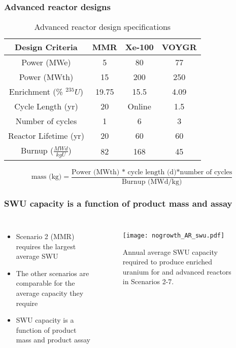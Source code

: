 \begin{frame}
    \frametitle{Advanced reactor designs}
    \begingroup
        \renewcommand{\arraystretch}{1.5}
        \begin{table}
            \small
            \caption{Advanced reactor design specifications}
            \label{tab:reactor_summary}
            \begin{tabular}{ c c c c }
                \hline
                Design Criteria & MMR 
                    \cite{noauthor_usnc_2021} & 
                    Xe-100 \cite{mulder_overview_2021} & 
                    VOYGR \cite{nuscale_chapter_2020-1,reyes_nuscale_2021,reyes_correction_2022}\\\hline
                Power (MWe) & 5 & 80 & 77\\
                Power (MWth) & 15 & 200 & 250\\
                Enrichment (\% $^{235}U$) & 19.75 & 15.5 & 4.09 \\
                Cycle Length (yr) & 20 & Online & 1.5 \\
                Number of cycles & 1 & 6 & 3\\
                Reactor Lifetime (yr) & 20 & 60 & 60\\
                Burnup ($\frac{MWd}{kg U}$) & 82 & 168 & 45\\
                \hline
            \end{tabular}
        \end{table}   
    \endgroup
    \begin{equation*}
        \text{mass (kg)} = \frac{\text{Power (MWth) * cycle length (d)*number of cycles}}{\text{Burnup (MWd/kg)}}
        \label{eq:fuel_mass}
    \end{equation*}
\end{frame}

\begin{frame}
    \frametitle{\gls{SWU} capacity is a function of product mass and assay}
    \begin{columns}
        \column[t]{4.3cm}
            \begin{itemize}
                \item Scenario 2 (MMR) requires the largest average \gls{SWU} 
                \item The other scenarios are comparable for the average 
                      capacity they require
                \item \gls{SWU} capacity is a function of product mass and 
                      product assay
                
            \end{itemize}
        \column[t]{6.3cm}
        \vspace{-1cm}
        \begin{figure}
                \centering
                \texttt{[image: nogrowth\_AR\_swu.pdf]}
                \caption{Annual average \gls{SWU} capacity required to produce 
                enriched uranium for and advanced reactors in Scenarios 2-7.}
                \label{fig:ot_swu}
        \end{figure}
    \end{columns}
\end{frame}

